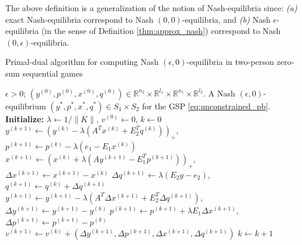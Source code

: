 \documentclass{article}
\begin{document}
The above definition is a generalization of the notion of
Nash-equilibria since: \textit{(a)} exact Nash-equilibria correspond
to Nash $(0,0)$-equilibria, and \textit{(b)} Nash
$\epsilon$-equilibria (in the sense of Definition
\ref{thm:approx_nash}) correspond to Nash $(0,\epsilon)$-equilibria.

\begin{algorithm}
\caption{Primal-dual algorithm for computing Nash $(\epsilon,
  0)$-equilibria in two-person zero-sum sequential games}
\label{Tab:algo}
\begin{algorithmic}[1]
\Require $\epsilon > 0$; $(y^{(0)},p^{(0)},x^{(0)},q^{(0)}) \in \mathbb{R}^{n_2}
  \times \mathbb{R}^{l_1} \times \mathbb{R}^{n_1} \times
  \mathbb{R}^{l_2}$.
\Ensure A Nash $(\epsilon,0)$-equilibrium
$({y^*},{p^*},{x^*},{q^*}) \in S_1 \times S_2$ for
the GSP \eqref{eq:unconstrained_pb}.
\State  \textbf{Initialize:} $\lambda \leftarrow 1/\|K\|$, ${v}^{(0)}
\leftarrow 0$, $k \leftarrow 0$
\State $y^{(k + 1)} \leftarrow (y^{(k)} - \lambda (A^Tx^{(k)} +
E_2^Tq^{(k)}))_+$, \hspace{.5em}$p^{(k+1)} \leftarrow p^{(k)} -
\lambda(e_1-E_1x^{(k)})$
\State $x^{(k + 1)} \leftarrow (x^{(k)} + \lambda (Ay^{(k+1)} -
E_1^Tp^{(k+1)}))_+$, \hspace{.5em}$\Delta x^{(k+1)} \leftarrow
x^{(k+1)}-x^{(k)}$
\State $\Delta q^{(k+1)} \leftarrow \lambda (E_2y -
e_2)$, \hspace{.5em}$q^{(k+1)} \leftarrow q^{(k)} + \Delta q^{(k+1)}$
\State $y^{(k+1)} \leftarrow y^{(k+1)} - \lambda (A^T\Delta x^{(k+1)}
+ E_2^T\Delta q^{(k+1)})$, \hspace{.5em}$\Delta y^{(k+1)} \leftarrow
y^{(k+1)}-y^{(k)}$
\State $p^{(k+1)} \leftarrow p^{(k+1)} + \lambda E_1\Delta x^{(k+1)}$,
\hspace{.5em} $\Delta p^{(k+1)} \leftarrow p^{(k+1)}-p^{(k)}$
\State ${v}^{(k+1)} \leftarrow {v}^{(k)} + (\Delta
y^{(k+1)},\Delta p^{(k+1)},\Delta x^{(k+1)},\Delta q^{(k+1)})$ 
\State $k \leftarrow k + 1$
\EndWhile
\end{algorithmic}
\end{algorithm}
\end{document}
